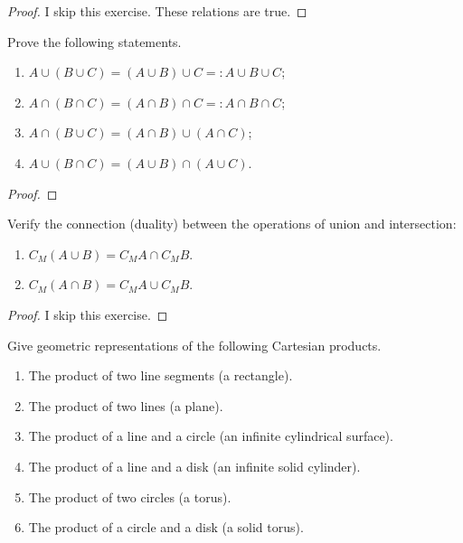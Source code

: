 \begin{proof}
    I skip this exercise. These relations are true.
\end{proof}
\newpage

\begin{exercise}
    Prove the following statements.
    \begin{enumerate}[label={(\alph*)}]
        \item $A\cup (B\cup C) = (A\cup B)\cup C =: A\cup B\cup C$;
        \item $A\cap (B\cap C) = (A\cap B)\cap C =: A\cap B\cap C$;
        \item $A\cap (B\cup C) = (A\cap B)\cup (A\cap C)$;
        \item $A\cup (B\cap C) = (A\cup B)\cap (A\cup C)$.
    \end{enumerate}
\end{exercise}

\begin{proof}
\end{proof}
\newpage

\begin{exercise}
    Verify the connection (duality) between the operations of union and intersection:
    \begin{enumerate}[label={(\alph*)}]
        \item $C_{M}(A\cup B) = C_{M}A\cap C_{M}B$.
        \item $C_{M}(A\cap B) = C_{M}A\cup C_{M}B$.
    \end{enumerate}
\end{exercise}

\begin{proof}
    I skip this exercise.
\end{proof}
\newpage

\begin{exercise}
    Give geometric representations of the following Cartesian products.
    \begin{enumerate}[label={(\alph*)}]
        \item The product of two line segments (a rectangle).
        \item The product of two lines (a plane).
        \item The product of a line and a circle (an infinite cylindrical surface).
        \item The product of a line and a disk (an infinite solid cylinder).
        \item The product of two circles (a torus).
        \item The product of a circle and a disk (a solid torus).
    \end{enumerate}
\end{exercise}

